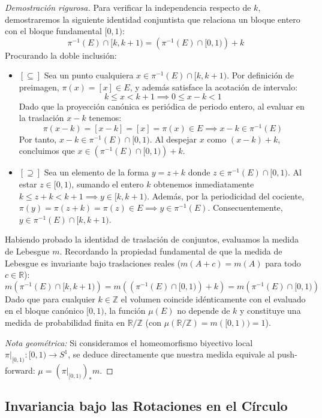 \begin{proof}[Demostración rigurosa]
	Para verificar la independencia respecto de $k$, demostraremos la siguiente identidad conjuntista que relaciona un bloque entero con el bloque fundamental $[0, 1)$:
	$$ \pi^{-1}(E) \cap [k, k+1) = \left( \pi^{-1}(E) \cap [0, 1) \right) + k $$
	Procurando la doble inclusión:
	\begin{itemize}
		\item $[\subseteq]$ Sea un punto cualquiera $x \in \pi^{-1}(E) \cap [k, k+1)$. Por definición de preimagen, $\pi(x) = [x] \in E$, y además satisface la acotación de intervalo:
		$$ k \le x < k+1 \implies 0 \le x - k < 1 $$
		Dado que la proyección canónica es periódica de periodo entero, al evaluar en la traslación $x - k$ tenemos:
		$$ \pi(x - k) = [x - k] = [x] = \pi(x) \in E \implies x - k \in \pi^{-1}(E) $$
		Por tanto, $x - k \in \pi^{-1}(E) \cap [0, 1)$. Al despejar $x$ como $(x - k) + k$, concluimos que $x \in \left( \pi^{-1}(E) \cap [0, 1) \right) + k$.
		
		\item $[\supseteq]$ Sea un elemento de la forma $y = z + k$ donde $z \in \pi^{-1}(E) \cap [0, 1)$. Al estar $z \in [0, 1)$, sumando el entero $k$ obtenemos inmediatamente $k \le z + k < k+1 \implies y \in [k, k+1)$. Además, por la periodicidad del cociente, $\pi(y) = \pi(z + k) = \pi(z) \in E \implies y \in \pi^{-1}(E)$. Consecuentemente, $y \in \pi^{-1}(E) \cap [k, k+1)$.
	\end{itemize}
	Habiendo probado la identidad de traslación de conjuntos, evaluamos la medida de Lebesgue $m$. Recordando la propiedad fundamental de que la medida de Lebesgue es invariante bajo traslaciones reales ($m(A + c) = m(A)$ para todo $c \in \mathbb{R}$):
	$$ m\left( \pi^{-1}(E) \cap [k, k+1) \right) = m\left( \left( \pi^{-1}(E) \cap [0, 1) \right) + k \right) = m\left( \pi^{-1}(E) \cap [0, 1) \right) $$
	Dado que para cualquier $k \in \mathbb{Z}$ el volumen coincide idénticamente con el evaluado en el bloque canónico $[0, 1)$, la función $\mu(E)$ no depende de $k$ y constituye una medida de probabilidad finita en $\mathbb{R}/\mathbb{Z}$ (con $\mu(\mathbb{R}/\mathbb{Z}) = m([0,1)) = 1$). 
	
	\textit{Nota geométrica:} Si consideramos el homeomorfismo biyectivo local $\pi|_{[0,1)}: [0,1) \to S^1$, se deduce directamente que nuestra medida equivale al push-forward: $\mu = (\pi|_{[0,1)})_* m$.
\end{proof}

\subsection{Invariancia bajo las Rotaciones en el Círculo}

